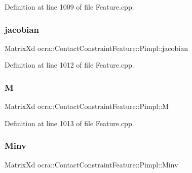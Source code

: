 Definition at line 1009 of file Feature.\+cpp.

\hypertarget{structocra_1_1ContactConstraintFeature_1_1Pimpl_ab7a5dfed0b05f6871bad4fcf61d7e998}{}\label{structocra_1_1ContactConstraintFeature_1_1Pimpl_ab7a5dfed0b05f6871bad4fcf61d7e998} 
\subsubsection{\texorpdfstring{jacobian}{jacobian}}
{\footnotesize\ttfamily Matrix\+Xd ocra\+::\+Contact\+Constraint\+Feature\+::\+Pimpl\+::jacobian}



Definition at line 1012 of file Feature.\+cpp.

\hypertarget{structocra_1_1ContactConstraintFeature_1_1Pimpl_a2de0104acc90d7ef05e0b5d5c6142ed5}{}\label{structocra_1_1ContactConstraintFeature_1_1Pimpl_a2de0104acc90d7ef05e0b5d5c6142ed5} 
\subsubsection{\texorpdfstring{M}{M}}
{\footnotesize\ttfamily Matrix\+Xd ocra\+::\+Contact\+Constraint\+Feature\+::\+Pimpl\+::M}



Definition at line 1013 of file Feature.\+cpp.

\hypertarget{structocra_1_1ContactConstraintFeature_1_1Pimpl_afa7af0eb036037f47dfa1b93c02cd3d5}{}\label{structocra_1_1ContactConstraintFeature_1_1Pimpl_afa7af0eb036037f47dfa1b93c02cd3d5} 
\subsubsection{\texorpdfstring{Minv}{Minv}}
{\footnotesize\ttfamily Matrix\+Xd ocra\+::\+Contact\+Constraint\+Feature\+::\+Pimpl\+::\+Minv}



